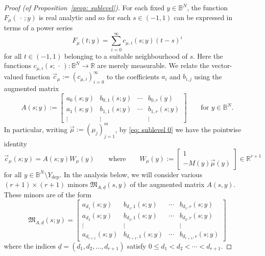 \documentclass[reqno]{amsart}
\numberwithin{equation}{section}
\newcommand{\B}{\mathbb{B}}
\newcommand{\R}{\mathbb{R}}
\newcommand{\fM}{\mathfrak{M}}
\theoremstyle{plain}
\theoremstyle{definition}
\begin{document}
\begin{proof}[Proof (of Proposition~\ref{prop: sublevel})]
 For each fixed $y \in \B^N$, the function $F_{\mu}(\,\cdot\,;y)$ is real analytic and so for each $s\in (-1,1)$ can be expressed in terms of a power series
        \begin{equation}\label{eq: sublevel 2}
          F_{\mu}(t;y) = \sum_{i = 0}^{\infty} c_{\mu,i}(s;y) (t-s)^i
        \end{equation}
for all $t \in (-1,1)$ belonging to a suitable neighbourhood of $s$. Here the functions $c_{\mu,i}(s;\,\cdot\,) \colon \B^N \to \R$ are merely measurable. We relate the vector-valued function $\vec{c}_{\mu} := (c_{\mu, i})_{i=0}^{\infty}$ to the coefficients $a_i$ and $b_{i,j}$ using the augmented matrix 
   \begin{equation*}
    A(s;y) := \begin{bmatrix}
            a_0(s;y) & b_{0, 1}(s;y) & \cdots & b_{0, r}(y) \\
            a_1(s;y) & b_{1, 1}(s;y) & \cdots & b_{1, r}(s;y) \\
            \vdots & \vdots & & \vdots 
        \end{bmatrix} \qquad \textrm{for $y \in \B^N$.}
    \end{equation*}
In particular, writing $\vec{\mu} := (\mu_j)_{j=1}^m$, by \eqref{eq: sublevel 0} we have the pointwise identity
\begin{equation}\label{eq: sublevel 3}
            \vec{c}_{\mu}(s;y) = A(s;y) W_{\mu}(y) \qquad \textrm{where} \qquad 
            W_{\mu}(y) := 
            \begin{bmatrix}
                1 \\
                -M(y)\vec{\mu}(y) 
            \end{bmatrix}  \in \R^{r+1}
        \end{equation}
for all $y \in \B^N\setminus Y_{\mathrm{dep}}$. In the analysis below, we will consider various $(r+1)\times (r+1)$ minors $\fM_{A,{\underline{d}}}(s,y)$ of the augmented matrix $A(s,y)$. These minors are of the form
\begin{equation*}
     \fM_{A,{\underline{d}}}(s;y) =  \begin{bmatrix}
            a_{d_1}(s;y) & b_{d_1, 1}(s;y) & \cdots & b_{ d_1,  r}(s;y) \\
            a_{d_2}(s;y) & b_{d_2, 1}(s; y) & \cdots & b_{d_2, r}(s; y) \\
            \vdots & \vdots & & \vdots \\
            a_{d_{r+1}}(s; y) & b_{d_{r+1},1}(s; y) & \cdots & b_{d_{r+1}, r}(s; y)
        \end{bmatrix}
    \end{equation*}
where the indices ${\underline{d}} = (d_1, d_2, \ldots, d_{r+1})$ satisfy $0 \le d_1 < d_2 < \cdots < d_{r+1}$.
\medskip
 

\end{proof}
\end{document}
